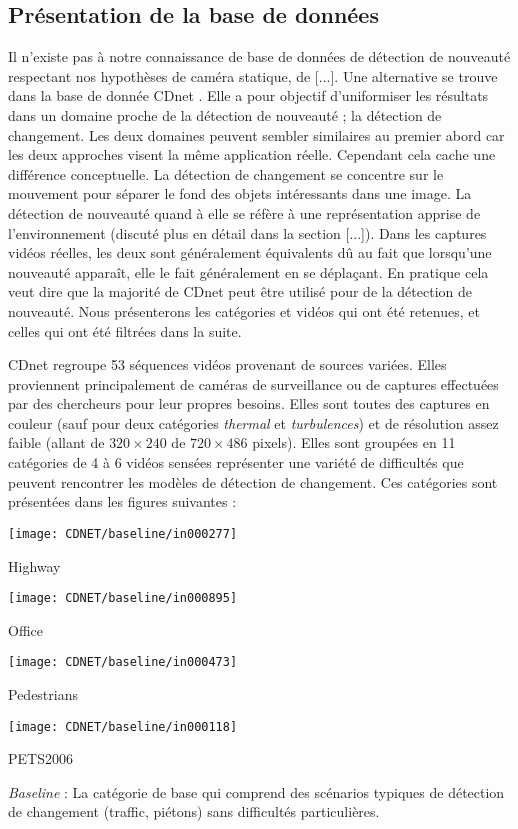 	\subsection{Présentation de la base de données}

	Il n'existe pas à notre connaissance de base de données de détection de nouveauté respectant nos hypothèses de caméra statique, de [...]. Une alternative se trouve dans la base de donnée CDnet \cite{wang-cdnet}. Elle a pour objectif d'uniformiser les résultats dans un domaine proche de la détection de nouveauté ; la détection de changement. Les deux domaines peuvent sembler similaires au premier abord car les deux approches visent la même application réelle. Cependant cela cache une différence conceptuelle. La détection de changement se concentre sur le mouvement pour séparer le fond des objets intéressants dans une image. La détection de nouveauté quand à elle se réfère à une représentation apprise de l'environnement (discuté plus en détail dans la section [...]). Dans les captures vidéos réelles, les deux sont généralement équivalents dû au fait que lorsqu'une nouveauté apparaît, elle le fait généralement en se déplaçant. En pratique cela veut dire que la majorité de CDnet peut être utilisé pour de la détection de nouveauté. Nous présenterons les catégories et vidéos qui ont été retenues, et celles qui ont été filtrées dans la suite.
	
	CDnet regroupe 53 séquences vidéos provenant de sources variées. Elles proviennent principalement de caméras de surveillance ou de captures effectuées par des chercheurs pour leur propres besoins. Elles sont toutes des captures en couleur (sauf pour deux catégories \textit{thermal} et \textit{turbulences}) et de résolution assez faible (allant de $320 \times 240$ de $720 \times 486$ pixels). Elles sont groupées en 11 catégories de 4 à 6 vidéos sensées représenter une variété de difficultés que peuvent rencontrer les modèles de détection de changement. Ces catégories sont présentées dans les figures suivantes :

	\begin{figureth}
		\begin{subfigureth}{0.24\textwidth}
			\texttt{[image: CDNET/baseline/in000277]}\caption{Highway}	
		\end{subfigureth}
		\begin{subfigureth}{0.24\textwidth}
			\texttt{[image: CDNET/baseline/in000895]}\caption{Office}	
		\end{subfigureth}
		\begin{subfigureth}{0.24\textwidth}
			\texttt{[image: CDNET/baseline/in000473]}\caption{Pedestrians}	
		\end{subfigureth}
		\begin{subfigureth}{0.24\textwidth}
			\texttt{[image: CDNET/baseline/in000118]}\caption{PETS2006}	
		\end{subfigureth}
		\caption[Catégorie Baseline]{\textit{Baseline} : La catégorie de base qui comprend des scénarios typiques de détection de changement (traffic, piétons) sans difficultés particulières.}\label{fig:cdnet:baseline}
	\end{figureth}

